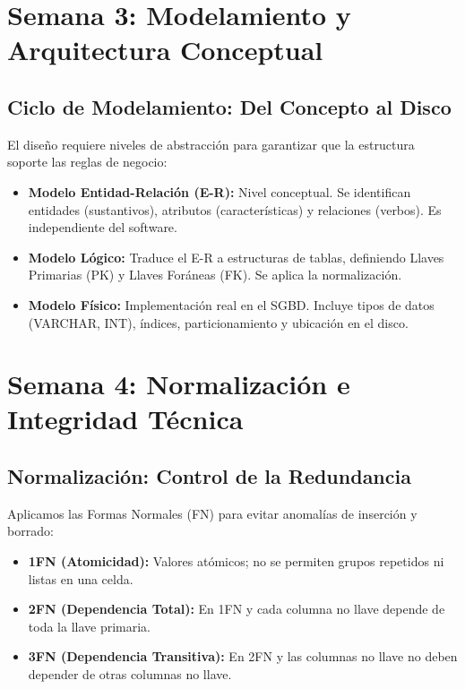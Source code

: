 \documentclass[12pt,a4paper,openany,oneside]{book}
\begin{document}
\section{Semana 3: Modelamiento y Arquitectura Conceptual}

\subsection{Ciclo de Modelamiento: Del Concepto al Disco}
El diseño requiere niveles de abstracción para garantizar que la estructura soporte las reglas de negocio:
\begin{itemize}
    \item \textbf{Modelo Entidad-Relación (E-R):} Nivel conceptual. Se identifican entidades (sustantivos), atributos (características) y relaciones (verbos). Es independiente del software.
    \item \textbf{Modelo Lógico:} Traduce el E-R a estructuras de tablas, definiendo Llaves Primarias (PK) y Llaves Foráneas (FK). Se aplica la normalización.
    \item \textbf{Modelo Físico:} Implementación real en el SGBD. Incluye tipos de datos (VARCHAR, INT), índices, particionamiento y ubicación en el disco.
\end{itemize}



\section{Semana 4: Normalización e Integridad Técnica}

\subsection{Normalización: Control de la Redundancia}
Aplicamos las Formas Normales (FN) para evitar anomalías de inserción y borrado:
\begin{itemize}
    \item \textbf{1FN (Atomicidad):} Valores atómicos; no se permiten grupos repetidos ni listas en una celda.
    \item \textbf{2FN (Dependencia Total):} En 1FN y cada columna no llave depende de toda la llave primaria.
    \item \textbf{3FN (Dependencia Transitiva):} En 2FN y las columnas no llave no deben depender de otras columnas no llave.
\end{itemize}
\end{document}
